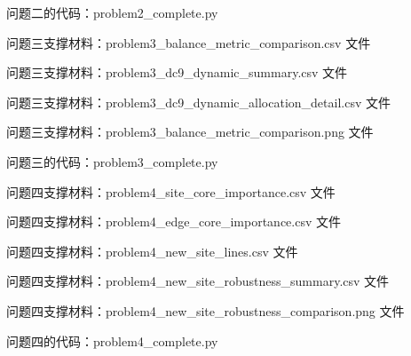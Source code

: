 \documentclass[UTF8,zihao=-4,a4paper,fontset=fandol]{ctexart}
\begin{document}
问题二的代码：problem2\_complete.py



问题三支撑材料：problem3\_balance\_metric\_comparison.csv 文件



问题三支撑材料：problem3\_dc9\_dynamic\_summary.csv 文件



问题三支撑材料：problem3\_dc9\_dynamic\_allocation\_detail.csv 文件



问题三支撑材料：problem3\_balance\_metric\_comparison.png 文件



问题三的代码：problem3\_complete.py



问题四支撑材料：problem4\_site\_core\_importance.csv 文件



问题四支撑材料：problem4\_edge\_core\_importance.csv 文件



问题四支撑材料：problem4\_new\_site\_lines.csv 文件



问题四支撑材料：problem4\_new\_site\_robustness\_summary.csv 文件



问题四支撑材料：problem4\_new\_site\_robustness\_comparison.png 文件



问题四的代码：problem4\_complete.py

\CumcmMainMatterEnd
\end{document}
